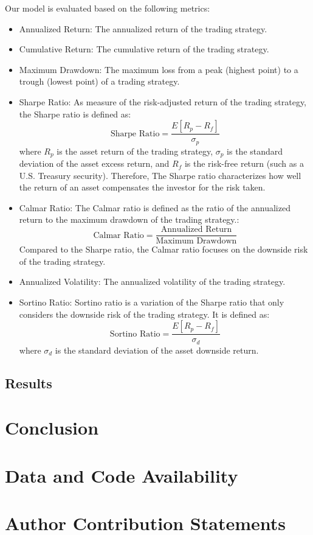 \documentclass[conference]{IEEEtran}
\begin{document}
Our model is evaluated based on the following metrics:
\begin{itemize}
  \item Annualized Return: The annualized return of the trading strategy.
  \item Cumulative Return: The cumulative return of the trading strategy.
  \item Maximum Drawdown: The maximum loss from a peak (highest point) to a trough (lowest point) of a trading strategy.
  \item Sharpe Ratio: As measure of the risk-adjusted return of the trading strategy, the Sharpe ratio is defined as: 
  \begin{equation}
    \text{Sharpe Ratio} = \frac{E[R_p - R_f]}{\sigma_p}
  \end{equation}
  where $R_p$ is the asset return of the trading strategy, $\sigma_p$ is the standard deviation of the asset excess return, and $R_f$ is the risk-free return (such as a U.S. Treasury security).
  Therefore, The Sharpe ratio characterizes how well the return of an asset compensates the investor for the risk taken.
  \item Calmar Ratio: 
  The Calmar ratio is defined as the ratio of the annualized return to the maximum drawdown of the trading strategy.:
  \begin{equation}
    \text{Calmar Ratio} = \frac{\text{Annualized Return}}{\text{Maximum Drawdown}}
  \end{equation}
  Compared to the Sharpe ratio, the Calmar ratio focuses on the downside risk of the trading strategy.

  \item Annualized Volatility: The annualized volatility of the trading strategy.
  \item Sortino Ratio: Sortino ratio is a variation of the Sharpe ratio that only considers the downside risk of the trading strategy. It is defined as:
  \begin{equation}
    \text{Sortino Ratio} = \frac{E[R_p - R_f]}{\sigma_d}
  \end{equation}
  where $\sigma_d$ is the standard deviation of the asset downside return.
\end{itemize}

\subsection{Results}


\section{Conclusion}


\section{Data and Code Availability}


\section{Author Contribution Statements}




\end{document}
